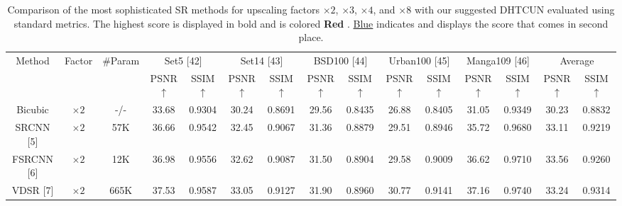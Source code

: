 \documentclass{ieeeaccess}
\begin{document}
\begin{table}
\caption{Comparison of the most sophisticated SR methods for upscaling factors $\times 2$, $\times 3$, $\times 4$, and $\times 8$ with our suggested DHTCUN evaluated using standard metrics. The highest score is displayed in bold and is colored {\color{red}\textbf{Red }}. {\color{blue}\underline{Blue}} indicates and displays the score that comes in second place.}

\label{table2}
\setlength{\tabcolsep}{4.5 pt}
\begin{tabular}{|c|c|c|cc|cc|cc|cc|cc|cc|}
\hline
\multirow{2}{*}{Method} & \multirow{2}{*}{Factor} & \multirow{2}{*}{\#Param}& \multicolumn{2}{c|}{Set5 [42]}& \multicolumn{2}{c|}{Set14 [43]}& \multicolumn{2}{c|}{BSD100 [44]}& \multicolumn{2}{c|}{Urban100 [45]}& \multicolumn{2}{c|}{Manga109 [46]}& \multicolumn{2}{c|}{Average}\\


 \cline{4-15}&&& \multicolumn{1}{c|}{PSNR$\uparrow$}  & SSIM{$\uparrow$}   & \multicolumn{1}{c|}{PSNR$\uparrow$}  & SSIM {$\uparrow$}   & \multicolumn{1}{c|}{PSNR$\uparrow$}  & SSIM {$\uparrow$}   & \multicolumn{1}{c|}{PSNR$\uparrow$}  & SSIM {$\uparrow$}  & \multicolumn{1}{c|}{PSNR$\uparrow$}  & SSIM {$\uparrow$}   & \multicolumn{1}{c|}{PSNR$\uparrow$}  & SSIM {$\uparrow$}  \\
 \hline

Bicubic&$\times2$ & -/-& \multicolumn{1}{c|}{33.68 } & 0.9304  & \multicolumn{1}{c|}{30.24 } &0.8691  & \multicolumn{1}{c|}{29.56 } & 0.8435  & \multicolumn{1}{c|}{26.88 } & 0.8405  & \multicolumn{1}{c|}{31.05 } & 0.9349&
\multicolumn{1}{c|}{30.23} & 0.8832 \\


SRCNN [5] & $\times 2$ & 57K& \multicolumn{1}{c|}{36.66 } & 0.9542  & \multicolumn{1}{c|}{32.45 } & 0.9067  &\multicolumn{1}{c|}{31.36 } & 0.8879  & \multicolumn{1}{c|}{29.51 } &0.8946 & \multicolumn{1}{c|}{35.72} &0.9680
&\multicolumn{1}{c|}{33.11} & 0.9219\\

FSRCNN [6]& $\times 2$& 12K & \multicolumn{1}{c|}{36.98} &0.9556& \multicolumn{1}{c|}{32.62} & 0.9087 &\multicolumn{1}{c|}{31.50} &0.8904& \multicolumn{1}{c|}{29.58} &0.9009& \multicolumn{1}{c|}{36.62} &0.9710
&\multicolumn{1}{c|}{33.56} & 0.9260\\

VDSR [7]& $\times 2$&665K& \multicolumn{1}{c|}{37.53} & 0.9587 & \multicolumn{1}{c|}{33.05} & 0.9127 &\multicolumn{1}{c|}{31.90} & 0.8960& \multicolumn{1}{c|}{30.77} & 0.9141 & \multicolumn{1}{c|}{37.16} & 0.9740
&\multicolumn{1}{c|}{33.24} & 0.9314\\


\end{tabular}
\end{table}
\end{document}
